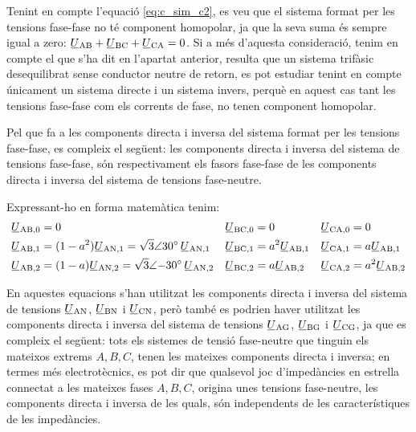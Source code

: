 \begin{center}
    
    \label{pic:Comp_sim_tens}
\end{center}

Tenint en compte l'equació \eqref{eq:c_sim_c2}, es veu que el sistema
format per les tensions fase-fase no té component homopolar, ja que
la seva suma  és sempre igual a zero: $\cmplx{U}\ped{AB} +
\cmplx{U}\ped{BC} + \cmplx{U}\ped{CA} = 0$. Si a més
d'aquesta consideració, tenim en compte el que s'ha dit en l'apartat
anterior, resulta que un sistema trifàsic desequilibrat sense conductor
neutre de retorn, es pot estudiar tenint en compte únicament un sistema directe
i un sistema invers, perquè en aquest cas tant les tensions fase-fase com els
corrents de fase, no tenen component homopolar.

Pel que fa a les components directa i inversa del sistema format per
les tensions fase-fase, es compleix el següent: les components
directa i inversa del sistema de tensions fase-fase, són
respectivament els fasors fase-fase de les components directa i
inversa del sistema de tensions fase-neutre.

Expressant-ho en forma matemàtica tenim:
\begin{subequations}
\begin{align}
   \cmplx{U}\ped{AB,0} &= 0 &
   \cmplx{U}\ped{BC,0} &= 0 &
   \cmplx{U}\ped{CA,0} &= 0 \\
   \cmplx{U}\ped{AB,1} &= (1-a^2) \cmplx{U}\ped{AN,1} =
   \sqrt{3}\angle\ang{30} \,\cmplx{U}\ped{AN,1} &
   \cmplx{U}\ped{BC,1} &= a^2 \cmplx{U}\ped{AB,1} &
   \cmplx{U}\ped{CA,1} &= a \cmplx{U}\ped{AB,1} \label{eq:c_sim_a3} \\
   \cmplx{U}\ped{AB,2} &= (1-a) \cmplx{U}\ped{AN,2}  =
   \sqrt{3}\angle{\ang{-30}} \,\cmplx{U}\ped{AN,2} &
   \cmplx{U}\ped{BC,2} &= a \cmplx{U}\ped{AB,2} &
   \cmplx{U}\ped{CA,2} &= a^2 \cmplx{U}\ped{AB,2} \label{eq:c_sim_b3}
\end{align}
\end{subequations}

En aquestes equacions s'han utilitzat les components directa i
inversa del sistema de tensions
$\cmplx{U}\ped{AN}$, $\cmplx{U}\ped{BN}$ i $\cmplx{U}\ped{CN}$,
però també es podrien haver utilitzat les components directa i
inversa del sistema de tensions
$\cmplx{U}\ped{AG}$, $\cmplx{U}\ped{BG}$ i $\cmplx{U}\ped{CG}$,
ja que es compleix el següent: tots els sistemes de tensió
fase-neutre que tinguin els mateixos extrems $A, B,
C$, tenen les mateixes components directa i inversa; en termes
més electrotècnics, es pot dir que qualsevol joc d'impedàncies en
estrella connectat a les mateixes fases $A, B, C$,
origina unes tensions fase-neutre, les components directa i inversa
de les quals, són independents de les característiques de les
impedàncies.

